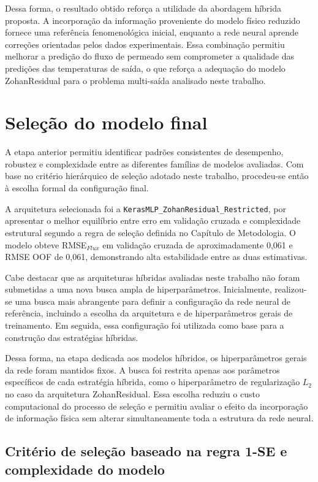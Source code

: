 Dessa forma, o resultado obtido reforça a utilidade da abordagem híbrida proposta. A incorporação da informação proveniente do modelo físico reduzido fornece uma referência fenomenológica inicial, enquanto a rede neural aprende correções orientadas pelos dados experimentais. Essa combinação permitiu melhorar a predição do fluxo de permeado sem comprometer a qualidade das predições das temperaturas de saída, o que reforça a adequação do modelo ZohanResidual para o problema multi-saída analisado neste trabalho.
\section{Seleção do modelo final}
\label{subsec:analise_modelo_selecionado}

A etapa anterior permitiu identificar padrões consistentes de desempenho, robustez e complexidade entre as diferentes famílias de modelos avaliadas. Com base no critério hierárquico de seleção adotado neste trabalho, procedeu-se então à escolha formal da configuração final.

A arquitetura selecionada foi a \texttt{KerasMLP\_ZohanResidual\_Restricted}, por apresentar o melhor equilíbrio entre erro em validação cruzada e complexidade estrutural segundo a regra de seleção definida no Capítulo de Metodologia. O modelo obteve RMSE$_{Flux}$ em validação cruzada de aproximadamente 0,061 e RMSE OOF de 0,061, demonstrando alta estabilidade entre as duas estimativas.

Cabe destacar que as arquiteturas híbridas avaliadas neste trabalho não foram submetidas a uma nova busca ampla de hiperparâmetros. Inicialmente, realizou-se uma busca mais abrangente para definir a configuração da rede neural de referência, incluindo a escolha da arquitetura e de hiperparâmetros gerais de treinamento. Em seguida, essa configuração foi utilizada como base para a construção das estratégias híbridas.

Dessa forma, na etapa dedicada aos modelos híbridos, os hiperparâmetros gerais da rede foram mantidos fixos. A busca foi restrita apenas aos parâmetros específicos de cada estratégia híbrida, como o hiperparâmetro de regularização $L_2$ no caso da arquitetura ZohanResidual. Essa escolha reduziu o custo computacional do processo de seleção e permitiu avaliar o efeito da incorporação de informação física sem alterar simultaneamente toda a estrutura da rede neural.

\subsection{Critério de seleção baseado na regra 1-SE e complexidade do modelo}

